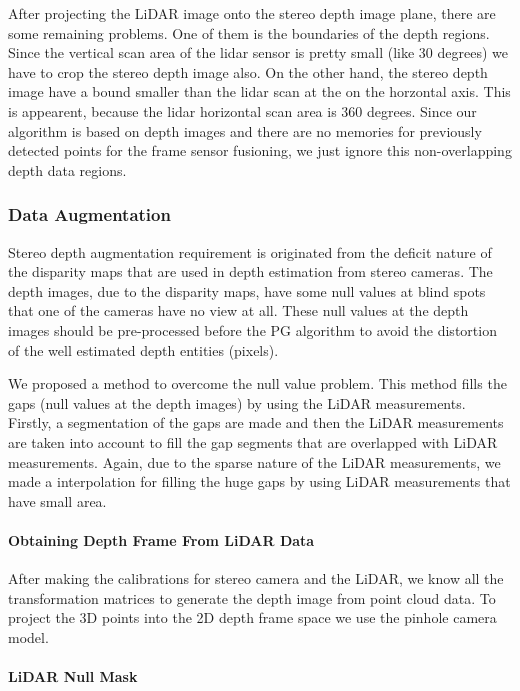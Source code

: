 \documentclass[conference]{IEEEtran}
\begin{document}
After projecting the LiDAR image onto the stereo depth image plane, there are some remaining problems. One of them is the boundaries of the depth regions. Since the vertical scan area of the lidar sensor is pretty small (like 30 degrees) we have to crop the stereo depth image also. On the other hand, the stereo depth image have a bound smaller than the lidar scan at the on the horzontal axis. This is appearent, because the lidar horizontal scan area is 360 degrees. Since our algorithm is based on depth images and there are no memories for previously detected points for the frame sensor fusioning, we just ignore this non-overlapping depth data regions.

\subsubsection{Data Augmentation}

Stereo depth augmentation requirement is originated from the deficit nature of the disparity maps that are used in depth estimation from stereo cameras. The depth images, due to the disparity maps, have some null values at blind spots that one of the cameras have no view at all. These null values at the depth images should be pre-processed before the PG algorithm to avoid the distortion of the well estimated depth entities (pixels).

We proposed a method to overcome the null value problem. This method fills the gaps (null values at the depth images) by using the LiDAR measurements. Firstly, a segmentation of the gaps are made and then the LiDAR measurements are taken into account to fill the gap segments that are overlapped with LiDAR measurements. Again, due to the sparse nature of the LiDAR measurements, we made a interpolation for filling the huge gaps by using LiDAR measurements that have small area. 


\paragraph{Obtaining Depth Frame From LiDAR Data}

After making the calibrations for stereo camera and the LiDAR, we know all the transformation matrices to generate the depth image from point cloud data. To project the 3D points into the 2D depth frame space we use the pinhole camera model. 

\paragraph{LiDAR Null Mask}
\end{document}
